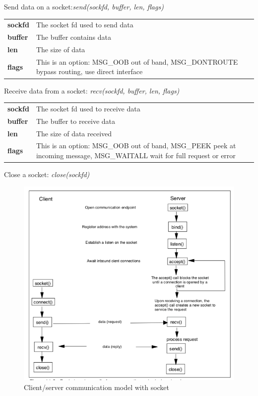 \documentclass[a4paper, 11pt]{article}
\begin{document}
\noindent Send data on a socket:\textit{send(sockfd, buffer, len, flags)}\\
	\begin{tabular}{ p{2cm} p{10cm} }
		\textbf{sockfd} & The socket fd used to send data\\
		\textbf{buffer} & The buffer contains data\\
		\textbf{len} & The size of data\\
		\textbf{flags} & This is an option: MSG\_OOB out of band, MSG\_DONTROUTE bypass routing, use direct interface
	\end{tabular}

\noindent Receive data from a socket: \textit{recv(sockfd, buffer, len, flags)}\\
	\begin{tabular}{ p{2cm} p{10cm} }
		\textbf{sockfd} & The socket fd used to receive data\\
		\textbf{buffer} & The buffer to  receive data\\
		\textbf{len} & The size of data received\\
		\textbf{flags} & This is an option: MSG\_OOB out of band, MSG\_PEEK peek at incoming message, MSG\_WAITALL wait for full request or error
	\end{tabular}
\noindent Close a socket: \textit{close(sockfd)}\\

\begin{figure}[h]
\includegraphics[scale=0.6]{client-server-socket.png}
\caption{Client/server communication model with socket}
\label{fig:client-server-socket}
\end{figure}
\end{document}
